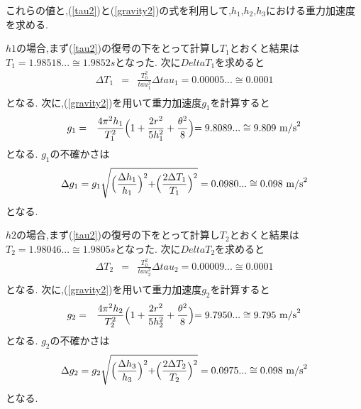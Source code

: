 \documentclass[a4j,10pt]{jarticle}
\begin{document}
これらの値と,(\ref{tau2})と(\ref{gravity2})の式を利用して,$h_1$,$h_2$,$h_3$における重力加速度を求める.

$h1$の場合,まず(\ref{tau2})の復号の下をとって計算し$T_1$とおくと結果は$T_1=1.98518...\cong1.9852s$となった.
次に$DeltaT_1$を求めると
\begin{eqnarray*}
  \Delta T_1 &=& \frac {T_0^2}{tau_1^2}\Delta tau_1 = 0.00005...\cong 0.0001 \\
\end{eqnarray*}
となる.
次に,(\ref{gravity2})を用いて重力加速度$g_1$を計算すると
\begin{eqnarray*}
  g_1  &=& \frac{4 \pi^2 h_1}{T_1^2} \Bigl(1 + \frac{2r^2}{5h_1^2} + \frac{\theta^2}{8} \Bigl) = 9.8089...\cong9.809\ {\rm m/s}^2 \\
\end{eqnarray*}
となる.
$g_1$の不確かさは
\begin{eqnarray*}
  \Delta g_1= g_1 \sqrt{\Bigl( \frac{\Delta h_1}{h_1} \Bigl)^2+\Bigl( \frac{2\Delta T_1}{T_1}\Bigl)^2 } = 0.0980...\cong0.098\ {\rm m/s}^2  \\
\end{eqnarray*}
となる.

$h2$の場合,まず(\ref{tau2})の復号の下をとって計算し$T_2$とおくと結果は$T_2=1.98046...\cong1.9805s$となった.
次に$DeltaT_2$を求めると
\begin{eqnarray*}
  \Delta T_2 &=& \frac {T_0^2}{tau_2^2}\Delta tau_2 = 0.00009...\cong 0.0001 \\
\end{eqnarray*}
となる.
次に,(\ref{gravity2})を用いて重力加速度$g_2$を計算すると
\begin{eqnarray*}
  g_2  &=& \frac{4 \pi^2 h_2}{T_2^2} \Bigl(1 + \frac{2r^2}{5h_2^2} + \frac{\theta^2}{8} \Bigl) = 9.7950...\cong9.795\ {\rm m/s}^2 \\
\end{eqnarray*}
となる.
$g_2$の不確かさは
\begin{eqnarray*}
  \Delta g_2= g_2 \sqrt{\Bigl( \frac{\Delta h_3}{h_3} \Bigl)^2+\Bigl( \frac{2\Delta T_2}{T_2}\Bigl)^2 } = 0.0975...\cong0.098\ {\rm m/s}^2  \\
\end{eqnarray*}
となる.
\end{document}
